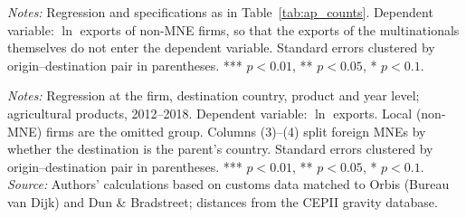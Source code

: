 \begin{table}[htbp]
\centering
\caption{Multinational presence and agricultural exports, by type of multinational, local firms}
\label{tab:ap_counts_local}
{\footnotesize\setlength{\tabcolsep}{4pt}\setlength{\extrarowheight}{1pt}
}

\begin{minipage}{0.95\linewidth}
\notesize
\vspace{0.6em}
\textit{Notes:} Regression and specifications as in Table~\ref{tab:ap_counts}. Dependent variable: $\ln$ exports of non-MNE firms, so that the exports of the multinationals themselves do not enter the dependent variable. Standard errors clustered by origin--destination pair in parentheses. *** $p<0.01$, ** $p<0.05$, * $p<0.1$.\\
\srcnote
\end{minipage}
\end{table}
\begin{table}[htbp]
\centering
\caption{Distance and firm agricultural exports: foreign and domestic multinationals}
\label{tab:ap_dist}
{\footnotesize\setlength{\tabcolsep}{4pt}\setlength{\extrarowheight}{1pt}
}

\begin{minipage}{0.95\linewidth}
\notesize
\vspace{0.6em}
\textit{Notes:} Regression at the firm, destination country, product and year level; agricultural products, 2012--2018. Dependent variable: $\ln$ exports. Local (non-MNE) firms are the omitted group. Columns (3)--(4) split foreign MNEs by whether the destination is the parent's country. Standard errors clustered by origin--destination pair in parentheses. *** $p<0.01$, ** $p<0.05$, * $p<0.1$.\\
\textit{Source:} Authors' calculations based on customs data matched to Orbis (Bureau van Dijk) and Dun \& Bradstreet; distances from the CEPII gravity database.
\end{minipage}
\end{table}

